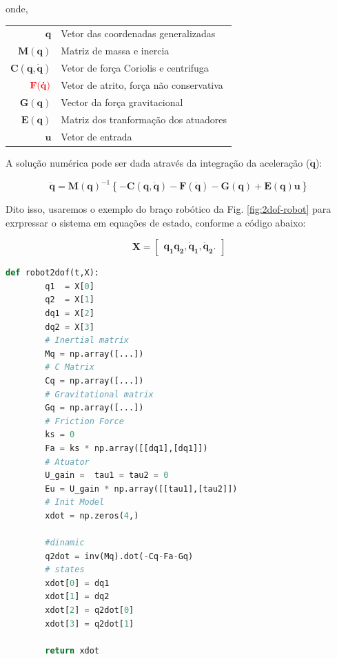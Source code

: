 onde, 
\begin{tabular}{ r | l }
  $\mathbf{q}$               & Vetor das coordenadas generalizadas   \\
  $\mathbf{M(q)}$            & Matriz de massa e inercia             \\
  $\mathbf{C(q, \dot{q})}$   & Vetor de força Coriolis e centrifuga  \\
  $\color{red}{\mathbf{F(\dot{q})}}$      & Vetor de atrito, força não conservativa\footnotemark\\
  $\mathbf{G(q)}$            & Vector da força gravitacional         \\
  $\mathbf{E(q)}$            & Matriz dos tranformação dos atuadores \\
  $\mathbf{u}$               & Vetor de entrada                      \\
\end{tabular}


A solução numérica pode ser dada através da integração da aceleração ($\mathbf{\ddot{q}}$):

\begin{equation}
    \mathbf{\ddot{q}}=\mathbf{M(q)}^{-1}\left\{\mathbf{-C(q, \dot{q})-F(\dot{q})-G(q) + E(q)u}\right\}
\end{equation}

Dito isso, usaremos o exemplo do braço robótico da Fig. \ref{fig:2dof-robot} para exrpressar o sistema em equações de estado, conforme a código abaixo:

\begin{equation*}
    \mathbf{X} = 
    \begin{bmatrix}
        \mathbf{q_1 q_2, \dot{q}_1, \dot{q}_2}.  
    \end{bmatrix}
\end{equation*}

\begin{lstlisting}[language=Python]
    def robot2dof(t,X):
        q1  = X[0]
        q2  = X[1]
        dq1 = X[2] 
        dq2 = X[3]
        # Inertial matrix
        Mq = np.array([...]) 
        # C Matrix
        Cq = np.array([...])
        # Gravitational matrix 
        Gq = np.array([...])
        # Friction Force
        ks = 0
        Fa = ks * np.array([[dq1],[dq1]])
        # Atuator
        U_gain =  tau1 = tau2 = 0
        Eu = U_gain * np.array([[tau1],[tau2]])
        # Init Model
        xdot = np.zeros(4,)
        
        #dinamic
        q2dot = inv(Mq).dot(-Cq-Fa-Gq)
        # states
        xdot[0] = dq1
        xdot[1] = dq2
        xdot[2] = q2dot[0]
        xdot[3] = q2dot[1]

        return xdot
\end{lstlisting}

